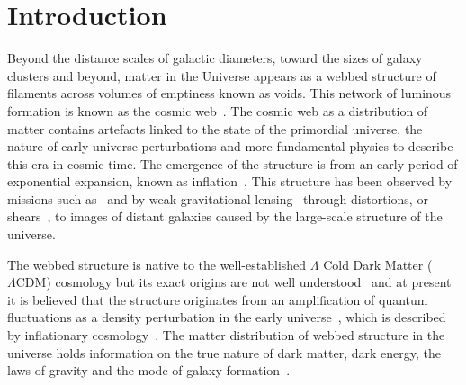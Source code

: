 \documentclass[twocolumn]{article}
\numberwithin{equation}{section}
\begin{document}


\section{Introduction}
Beyond the distance scales of galactic diameters, toward the sizes of galaxy clusters and beyond, matter in the Universe 
appears as a webbed structure of filaments across volumes of emptiness known as voids. This network of luminous formation 
is known as the cosmic web~\cite{bond_cw1, Coles_cw2, Forero_cw3, Dietrich_cw4, cw_phenomenon}. The cosmic web as a 
distribution of matter contains artefacts linked to the state of the primordial universe, the nature of early universe 
perturbations and more fundamental physics to describe this era in cosmic time. The emergence of the structure is from 
an early period of exponential expansion, known as inflation~\cite{inflation_cosmo2}. This structure has been observed by 
missions such as~\cite{sdss1, 2df} and by weak gravitational lensing~\cite{glens_book} through distortions, or 
shears~\cite{shear_review}, to images of distant galaxies caused by the large-scale structure of the universe. 

The webbed structure is native to the well-established $\Lambda$ Cold Dark Matter ($\Lambda \text{CDM}$) cosmology but 
its exact origins are not well understood~\cite{class_perturbs} and at present it is believed that the structure originates 
from an amplification of quantum fluctuations as a density perturbation in the early universe~\cite{perturbation_theory}, 
which is described by inflationary cosmology~\cite{inflation_cosmology}. The matter distribution of webbed structure in 
the universe holds information on the true nature of dark matter, dark energy, the laws of gravity and the mode of galaxy 
formation~\cite{DarkEnergySurvey, kids_lensing, kids_cosmo, gal_formation, gal_formation2}.
\end{document}
